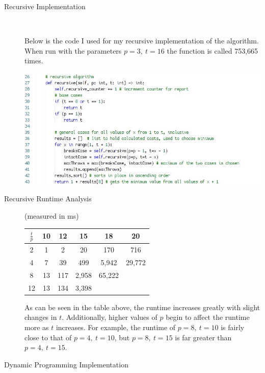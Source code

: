 \documentclass[12pt]{article}
\begin{document}
\begin{description}
    \item [Recursive Implementation]\ 
    
    Below is the code I used for my recursive implementation of the algorithm.
    When run with the parameters $p = 3,~t = 16$ the function is called 753,665 times.
    \begin{center}
        \includegraphics[width=5.5in]{recursive.png}
    \end{center}

    \item [Recursive Runtime Analysis] (measured in ms)
    
    \begin{center}
        \begin{tabular}{|c|c|c|c|c|c|}\hline
            $\frac{t}{p}$ & 10 & 12 & 15 & 18 & 20 \\\hline
            2 & 1 & 2 & 20 & 170 & 716 \\\hline
            4 & 7 & 39 & 499 & 5,942 & 29,772\\\hline
            8 & 13 & 117 & 2,958 & 65,222 & \\\hline
            12 & 13 & 134 & 3,398 & & \\\hline
        \end{tabular}
    \end{center}
    As can be seen in the table above, the runtime increases greatly with slight
    changes in $t$. Additionally, higher values of $p$ begin to affect the runtime
    more as $t$ increases. For example, the runtime of $p = 8,~t = 10$ is fairly
    close to that of $p = 4,~t = 10$, but $p = 8,~t = 15$ is far greater than
    $p = 4,~t = 15$.

    \pagebreak
    \item [Dynamic Programming Implementation]\ 
    

\end{description}
\end{document}
